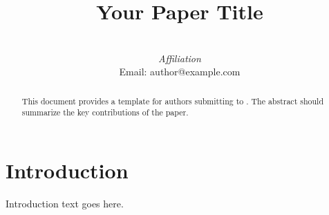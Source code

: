 \documentclass{article}
\title{Your Paper Title}
\author{\customauthor{Author Name} \\ \textit{Affiliation} \\ Email: author@example.com}
\date{}
\begin{document}
\maketitle

\begin{abstract}
This document provides a template for authors submitting to \confname. The abstract should summarize the key contributions of the paper.
\end{abstract}


\section{Introduction}
Introduction text goes here.




\end{document}
